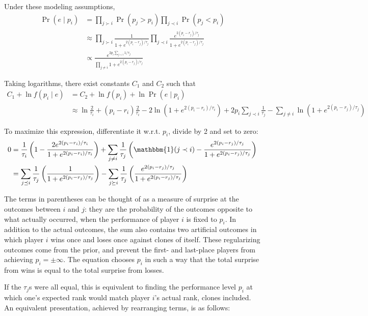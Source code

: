 \documentclass{article}
\begin{document}
Under these modeling assumptions,
\begin{align}
\Pr(e\mid p_i) &= \prod_{j \succ i} \Pr(p_j > p_i) \prod_{j \prec i} \Pr(p_j < p_i)
\\&\approx \prod_{j \succ i} \frac {1} {1 + e^{2(p_i-r_j)/\tau_j}} \prod_{j \prec i} \frac {e^{2(p_i-r_j)/\tau_j}} {1 + e^{2(p_i-r_j)/\tau_j}}
\\&\propto \frac {e^{2p_i\sum_{j\prec i}1/\tau_j}} {\prod_{j\neq i} 1 + e^{2(p_i-r_j)/\tau_j}}
\end{align}

Taking logarithms, there exist constants $C_1$ and $C_2$ such that
\begin{align}
C_1 + \ln f(p_i\mid e) &= C_2 + \ln f(p_i) + \ln \Pr(e\mid p_i)
\\&\approx \ln \frac{2}{\tau_i} + (p_i-r_i)\frac{2}{\tau_i} - 2\ln\left(1 + e^{2(p_i-r_i)/\tau_i} \right) + 2p_i\sum_{j\prec i} \frac{1}{\tau_j} - \sum_{j\neq i} \ln\left(1 + e^{2(p_i-r_j)/\tau_j}\right)
\end{align}

To maximize this expression, differentiate it w.r.t. $p_i$, divide by 2 and set to zero:
\begin{align}
0 &= \frac{1}{\tau_i}\left(1 - \frac {2e^{2(p_i-r_i)/\tau_i}} {1 + e^{2(p_i-r_i)/\tau_i}} \right) + \sum_{j\neq i}\frac{1}{\tau_j}\left(\mathbbm{1}(j\prec i) - \frac {e^{2(p_i-r_j)/\tau_j}} {1 + e^{2(p_i-r_j)/\tau_j}} \right)
\\&= \sum_{j\preceq i}\frac{1}{\tau_j}\left(\frac {1} {1 + e^{2(p_i-r_j)/\tau_j}} \right)
	- \sum_{j\succeq i}\frac{1}{\tau_j}\left(\frac {e^{2(p_i-r_j)/\tau_j}} {1 + e^{2(p_i-r_j)/\tau_j}} \right)
\end{align}

The terms in parentheses can be thought of as a measure of surprise at the outcomes between $i$ and $j$: they are the probability of the outcomes opposite to what actually occurred, when the performance of player $i$ is fixed to $p_i$. In addition to the actual outcomes, the sum also contains two artificial outcomes in which player $i$ wins once and loses once against clones of itself. These regularizing outcomes come from the prior, and prevent the first- and last-place players from achieving $p_i = \pm\infty$. The equation chooses $p_i$ in such a way that the total surprise from wins is equal to the total surprise from losses.

If the $\tau_j$s were all equal, this is equivalent to finding the performance level $p_i$ at which one's expected rank would match player $i$'s actual rank, clones included. An equivalent presentation, achieved by rearranging terms, is as follows:
\end{document}
